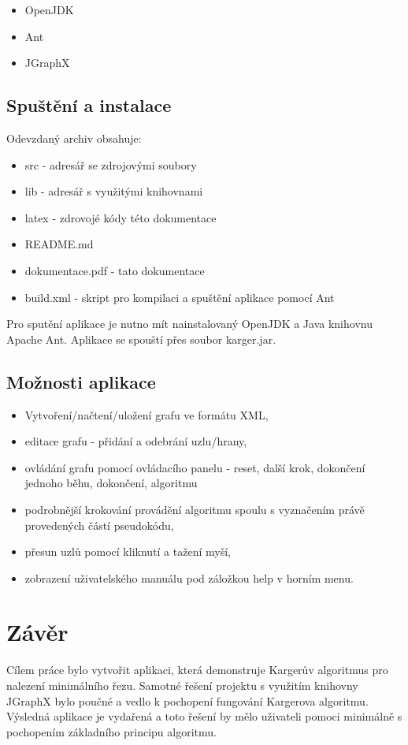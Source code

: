 \documentclass[../projekt.tex]{subfiles}
\begin{document}
\begin{itemize}
	\item OpenJDK
	\item Ant 
	\item JGraphX
\end{itemize}


\subsection{Spuštění a instalace}

Odevzdaný archiv obsahuje:

\begin{itemize}
	\item src - adresář se zdrojovými soubory
	\item lib - adresář s využitými knihovnami
	\item latex - zdrovojé kódy této dokumentace 
	\item README.md
	\item dokumentace.pdf - tato dokumentace 
	\item build.xml - skript pro kompilaci a spuštění aplikace pomocí Ant
\end{itemize}

\noindent Pro sputění aplikace je nutno mít nainstalovaný OpenJDK a Java knihovnu Apache Ant. Aplikace se spouští přes soubor karger.jar.


\subsection{Možnosti aplikace}

\begin{itemize}
	\item Vytvoření/načtení/uložení grafu ve formátu XML,
	\item editace grafu - přidání a odebrání uzlu/hrany,
	\item ovládání grafu pomocí ovládacího panelu - reset, další krok, dokončení jednoho běhu, dokončení, algoritmu
	\item podrobnější krokování provádění algoritmu spoulu s vyznačením právě provedených částí pseudokódu,
	\item přesun uzlů pomocí kliknutí a tažení myší,
	\item zobrazení uživatelského manuálu pod záložkou help v horním menu.
\end{itemize}



\section{Závěr}

Cílem práce bylo vytvořit aplikaci, která demonstruje Kargerův algoritmus pro nalezení minimálního řezu. Samotné řešení projektu s využitím knihovny JGraphX bylo poučné a vedlo k pochopení fungování Kargerova algoritmu. Výsledná aplikace je vydařená a toto řešení by mělo uživateli pomoci minimálně s pochopením základního principu algoritmu.
\end{document}
